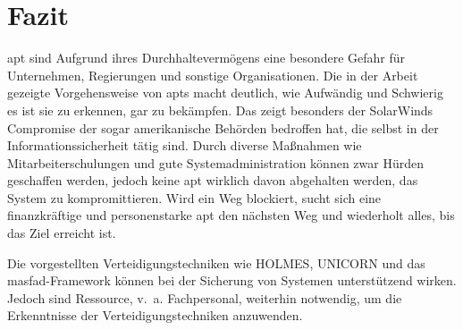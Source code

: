 \documentclass[conference]{IEEEtran}
\begin{document}
\section{Fazit}
\ac{apt} sind Aufgrund ihres Durchhaltevermögens eine besondere Gefahr für Unternehmen, Regierungen und sonstige Organisationen.
Die in der Arbeit gezeigte Vorgehensweise von \acp{apt} macht deutlich, wie Aufwändig und Schwierig es ist sie zu erkennen, gar zu bekämpfen.
Das zeigt besonders der SolarWinds Compromise der sogar amerikanische Behörden bedroffen hat, die selbst in der Informationssicherheit tätig sind.
Durch diverse Maßnahmen wie Mitarbeiterschulungen und gute Systemadministration können zwar Hürden geschaffen werden, jedoch keine \ac{apt} wirklich davon abgehalten werden, das System zu kompromittieren.
Wird ein Weg blockiert, sucht sich eine finanzkräftige und personenstarke \ac{apt} den nächsten Weg und wiederholt alles, bis das Ziel erreicht ist.

Die vorgestellten Verteidigungstechniken wie HOLMES, UNICORN und das \ac{masfad}-Framework können bei der Sicherung von Systemen unterstützend wirken.
Jedoch sind Ressource, v.~a. Fachpersonal, weiterhin notwendig, um die Erkenntnisse der Verteidigungstechniken anzuwenden.

\balance


\end{document}
